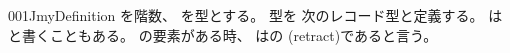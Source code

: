 \documentclass[index]{subfiles}
\begin{document}
\begin{myBlock}{001J}{myDefinition}
  を階数、
  を型とする。
  型を
  次のレコード型と定義する。
  は
  と書くこともある。
  の要素がある時、
  はの
  (retract)であると言う。
\end{myBlock}
\end{document}
